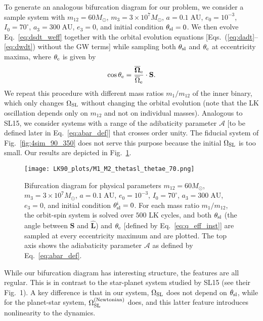 \documentclass[
        twocolumn,
        twocolappendix
    ]{aastex63}
\renewcommand*{\bm}[1]{\boldsymbol{\mathbf{#1}}}
\newcommand*{\uv}[1]{\hat{\bm{#1}}}
\begin{document}
To generate an analogous bifurcation diagram for our problem, we
consider a sample system with $m_{12} = 60M_{\odot}$, $m_3 = 3 \times 10^7
M_{\odot}$, $a = 0.1\;\mathrm{AU}$, $e_0 = 10^{-3}$, $I_0 = 70^\circ$, $a_3 =
300\;\mathrm{AU}$, $e_3 = 0$, and initial condition $\theta_{\rm sl} = 0$.
We then evolve Eq.~\eqref{eq:dsdt_weff} together with the orbital evolution
equations [Eqs.~(\ref{eq:dadt}--\ref{eq:dwdt}) without the GW terms] while
sampling both $\theta_{\rm sl}$ and $\theta_{\rm e}$ at eccentricity maxima,
where $\theta_{\rm e}$ is given by
\begin{equation}
    \cos \theta_{\rm e} = \frac{\bm{\overline{\Omega}}_{\rm e}}{
        \overline{\Omega}_{\rm e}}\cdot \bm{S}.\label{eq:q_eff_inst}
\end{equation}
We repeat this procedure with different mass ratios $m_1 / m_{12}$ of the inner
binary, which only changes $\Omega_{\rm SL}$ without changing the orbital
evolution (note that the LK oscillation depends only on $m_{12}$ and not on
individual masses). Analogous to SL15, we consider systems with a range of the
adibaticity parameter $\mathcal{A}$ [to be defined later in
Eq.~\eqref{eq:abar_def}] that crosses order unity. The fiducial system of
Fig.~\ref{fig:4sim_90_350} does not serve this purpose because the initial
$\Omega_{\rm SL}$ is too small. Our results are depicted in
Fig.~\ref{fig:bifurcation_70}.
\begin{figure}
    \centering
    \texttt{[image: LK90\_plots/M1\_M2\_thetasl\_thetae\_70.png]}
    \caption{Bifurcation diagram for physical parameters $m_{12} = 60M_{\odot}$,
    $m_3 = 3 \times 10^7 M_{\odot}$, $a = 0.1\;\mathrm{AU}$, $e_0 = 10^{-3}$,
    $I_0 = 70^\circ$, $a_3 = 300\;\mathrm{AU}$, $e_3 = 0$, and initial condition
    $\theta_{\rm sl}^{\rm i} = 0$. For each mass ratio $m_1 / m_{12}$, the
    orbit-spin system is solved over $500$ LK cycles, and both $\theta_{\rm sl}$
    (the angle between $\bm{S}$ and $\uv{L}$) and $\theta_{\rm e}$ [defined by
    Eq.~\eqref{eq:q_eff_inst}] are sampled at every eccentricity maximum and are
    plotted. The top axis shows the adiabaticity parameter $\mathcal{A}$ as
    defined by Eq.~\eqref{eq:abar_def}.}\label{fig:bifurcation_70}
\end{figure}

While our bifurcation diagram has interesting structure, the features are all
regular. This is in contrast to the star-planet system studied by SL15 (see
their Fig.~1). A key difference is that in our system, $\Omega_{\rm SL}$ does
not depend on $\theta_{\rm sl}$, while for the planet-star system, $\Omega_{\rm
SL}^{\rm (Newtonian)}$ does, and this latter feature introduces nonlinearity to
the dynamics.
\end{document}
